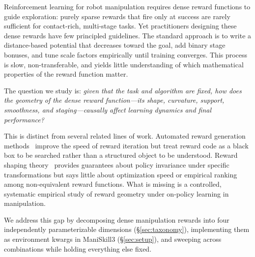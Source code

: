\documentclass{article}
\begin{document}
Reinforcement learning for robot manipulation requires dense reward functions to guide
exploration: purely sparse rewards that fire only at success are rarely sufficient for
contact-rich, multi-stage tasks. Yet practitioners designing these dense rewards have
few principled guidelines. The standard approach is to write a distance-based potential
that decreases toward the goal, add binary stage bonuses, and tune scale factors
empirically until training converges. This process is slow, non-transferable, and yields
little understanding of which mathematical properties of the reward function matter.

The question we study is: \emph{given that the task and algorithm are fixed, how does
the geometry of the dense reward function---its shape, curvature, support, smoothness,
and staging---causally affect learning dynamics and final performance?}

This is distinct from several related lines of work. Automated reward generation
methods~\citep{ma2024eureka} improve the speed of reward iteration but treat reward code
as a black box to be searched rather than a structured object to be understood.
Reward shaping theory~\citep{ng1999shaping,devlin2012potential} provides guarantees
about policy invariance under specific transformations but says little about optimization
speed or empirical ranking among non-equivalent reward functions. What is missing is a
controlled, systematic empirical study of reward geometry under on-policy learning in
manipulation.

We address this gap by decomposing dense manipulation rewards into four independently
parameterizable dimensions (\S\ref{sec:taxonomy}), implementing them as environment
kwargs in ManiSkill3 (\S\ref{sec:setup}), and sweeping across combinations while
holding everything else fixed.
\end{document}
